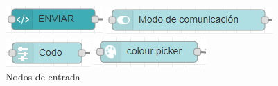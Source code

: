\begin{itemize}
\begin{itemize}
\begin{figure}[H]
  \centering
  \begin{minipage}[t]{0.3\textwidth}
    \includegraphics[width=\textwidth]{figuras/templateNode.png}
  \end{minipage}
  \hfill
  \begin{minipage}[t]{0.4\textwidth}
    \includegraphics[width=\textwidth]{figuras/switchinputNode.png}
  \end{minipage}
  \begin{minipage}[b]{0.3\textwidth}
    \includegraphics[width=\textwidth]{figuras/sliderNode.png}
  \end{minipage}
  \hfill
  \begin{minipage}[b]{0.3\textwidth}
    \includegraphics[width=\textwidth]{figuras/colourNode.png}
  \end{minipage}
  \caption{Nodos de entrada}\label{fig:nodeinput}
\end{figure}


\end{itemize}
\end{itemize}
